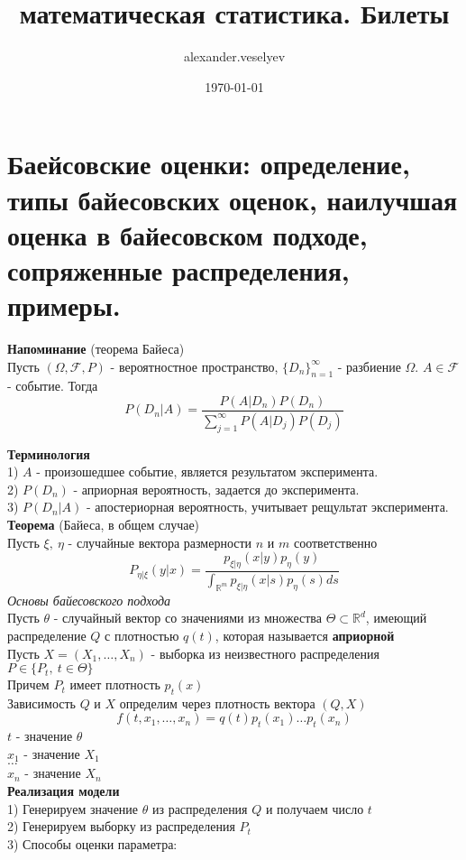 \documentclass{article}
\title{математическая статистика. Билеты}
\author{alexander.veselyev }
\date{\today}
\begin{document}
\section{Баейсовские оценки: определение, типы байесовских оценок, наилучшая оценка в
байесовском подходе, сопряженные распределения, примеры.}
\textbf{Напоминание} (теорема Байеса)\\
Пусть $(\Omega, \mathcal{F}, P)$ - вероятностное пространство, $\{D_n\}_{n=1}^\infty$ - разбиение $\Omega$. $A\in\mathcal{F}$ - событие. Тогда 
$$ P(D_n|A) = \frac{P(A|D_n)P(D_n)}{\sum_{j=1}^\infty{P(A|D_j)P(D_j)}}$$

\textbf{Терминология}\\
1) $A$ - произошедшее событие, является результатом эксперимента.\\
2) $P(D_n)$ - априорная вероятность, задается до эксперимента.\\
3) $P(D_n|A)$ - апостериорная вероятность, учитывает рещультат эксперимента.\\
\textbf{Теорема} (Байеса, в общем случае)\\
Пусть $\xi,\ \eta$ - случайные вектора размерности $n$ и $m$ соответственно\\
$$ P_{\eta|\xi}(y|x) = \frac{p_{\xi|\eta}(x|y)p_\eta(y)}{\int_{\mathbb{R}^m}p_{\xi|\eta}(x|s)p_\eta(s)ds} $$
\textit{Основы байесовского подхода}\\
Пусть $\theta$ - случайный вектор со значениями из множества $\Theta\subset\mathbb{R}^d$, имеющий распределение $Q$ с плотностью $q(t)$, которая называется \textbf{априорной}\\
Пусть $X = (X_1,\dots,X_n)$ - выборка из неизвестного распределения $P\in\{P_t,\ t\in\Theta\}$\\
Причем $P_t$ имеет плотность $p_t(x)$\\
Зависимость $Q$ и $X$ определим через плотность вектора $(Q,X)$\\
$$ f(t,x_1,\dots,x_n) = q(t)p_t(x_1)\dots p_t(x_n)$$
$t$ - значение $\theta$\\
$x_1$ - значение $X_1$\\
$\dots$\\
$x_n$ - значение $X_n$\\
\textbf{Реализация модели}\\
1) Генерируем значение $\theta$ из распределения $Q$ и получаем число $t$\\
2) Генерируем выборку из распределения $P_t$\\
3) Способы оценки параметра:
\end{document}
